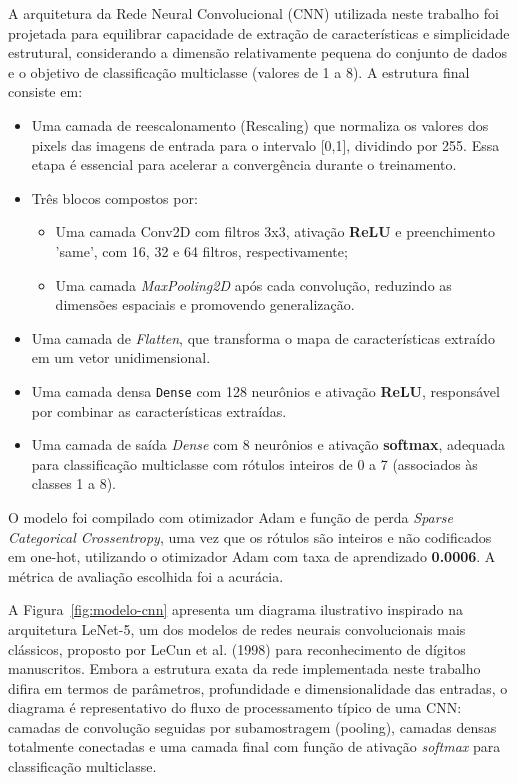 A arquitetura da Rede Neural Convolucional (CNN) utilizada neste trabalho foi projetada para equilibrar 
capacidade de extração de características e simplicidade estrutural, considerando a dimensão relativamente 
pequena do conjunto de dados e o objetivo de classificação multiclasse (valores de 1 a 8). A estrutura final consiste em:

\begin{itemize}
\item Uma camada de reescalonamento (Rescaling) que normaliza os valores dos pixels das imagens de entrada para o intervalo
[0,1], dividindo por 255. Essa etapa é essencial para acelerar a convergência durante o treinamento.
\item Três blocos compostos por:
    \begin{itemize}
        \item Uma camada Conv2D com filtros 3x3, ativação \textbf{ReLU} e preenchimento 'same', com 16, 32 e 64 filtros, respectivamente; 
        \item Uma camada \textit{MaxPooling2D} após cada convolução, reduzindo as dimensões espaciais e promovendo generalização.
    \end{itemize}
\item Uma camada de \textit{Flatten}, que transforma o mapa de características extraído em um vetor unidimensional.
\item Uma camada densa \texttt{Dense}  com 128 neurônios e ativação \textbf{ReLU}, responsável por combinar as características extraídas.
\item Uma camada de saída \textit{Dense} com 8 neurônios e ativação \textbf{softmax}, adequada para classificação multiclasse com rótulos 
inteiros de 0 a 7 (associados às classes 1 a 8).
\end{itemize}

O modelo foi compilado com otimizador Adam e função de perda \textit{Sparse Categorical Crossentropy}, uma vez que os rótulos são 
inteiros e não codificados em one-hot, utilizando o otimizador Adam com taxa de aprendizado \textbf{0.0006}. A métrica de avaliação 
escolhida foi a acurácia.

A Figura~\ref{fig:modelo-cnn} apresenta um diagrama ilustrativo inspirado na arquitetura LeNet-5, 
um dos modelos de redes neurais convolucionais mais clássicos, proposto por LeCun et al. (1998) para 
reconhecimento de dígitos manuscritos. Embora a estrutura exata da rede implementada neste trabalho difira em 
termos de parâmetros, profundidade e dimensionalidade das entradas, o diagrama é representativo do fluxo de 
processamento típico de uma CNN: camadas de convolução seguidas por subamostragem (pooling), camadas densas 
totalmente conectadas e uma camada final com função de ativação \textit{softmax} para classificação multiclasse.

